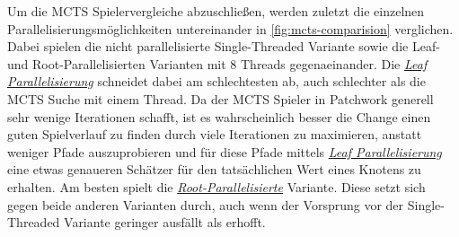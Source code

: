 \pagebreak

Um die \ac{MCTS} Spielervergleiche abzuschließen, werden zuletzt die einzelnen Parallelisierungsmöglichkeiten untereinander in \ref{fig:mcts-comparision} verglichen. Dabei spielen die nicht parallelisierte Single-Threaded Variante sowie die Leaf- und Root-Parallelisierten Varianten mit 8 Threads gegenaeinander. Die \hyperref[text:leaf-parallelization]{\emph{Leaf Parallelisierung}} schneidet dabei am schlechtesten ab, auch schlechter als die \ac{MCTS} Suche mit einem Thread. Da der \ac{MCTS} Spieler in Patchwork generell sehr wenige Iterationen schafft, ist es wahrscheinlich besser die Change einen guten Spielverlauf zu finden durch viele Iterationen zu maximieren, anstatt weniger Pfade auszuprobieren und für diese Pfade mittels \hyperref[text:leaf-parallelization]{\emph{Leaf Parallelisierung}} eine etwas genaueren Schätzer für den tatsächlichen Wert eines Knotens zu erhalten. Am besten spielt die \hyperref[text:root-parallelization]{\emph{Root-Parallelisierte}} Variante. Diese setzt sich gegen beide anderen Varianten durch, auch wenn der Vorsprung vor der Single-Threaded Variante geringer ausfällt als erhofft.

